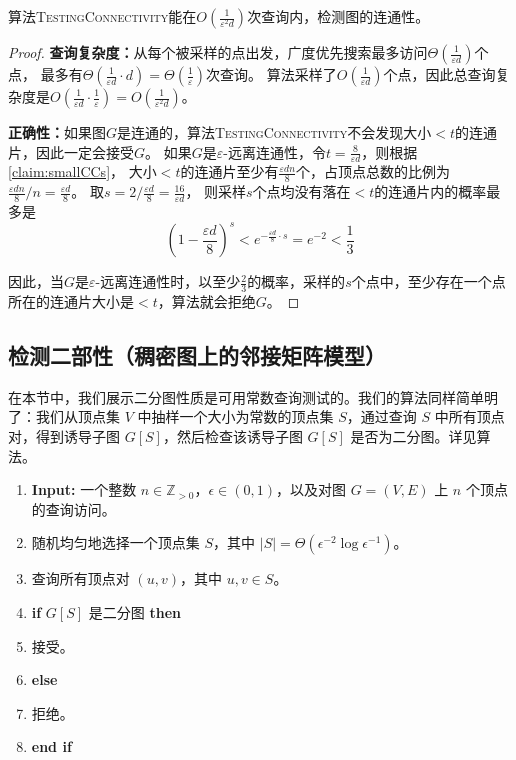 \begin{theorem}
    算法\textsc{TestingConnectivity}能在$O(\frac{1}{\varepsilon^2d})$次查询内，检测图的连通性。
\end{theorem}

\begin{proof}
    \textbf{查询复杂度：}从每个被采样的点出发，广度优先搜索最多访问$\Theta(\frac{1}{\varepsilon d})$个点，
    最多有$\Theta(\frac{1}{\varepsilon d}\cdot d)=\Theta(\frac{1}{\varepsilon})$次查询。
    算法采样了$O(\frac{1}{\varepsilon d})$个点，因此总查询复杂度是$O(\frac{1}{\varepsilon d}\cdot\frac{1}{\varepsilon})=O(\frac{1}{\varepsilon^2 d})$。

    \textbf{正确性：}如果图$G$是连通的，算法\textsc{TestingConnectivity}不会发现大小$<t$的连通片，因此一定会接受$G$。
    如果$G$是$\varepsilon$-远离连通性，令$t=\frac{8}{\varepsilon d}$，则根据\cref{claim:smallCCs}，
    大小$<t$的连通片至少有$\frac{\varepsilon dn}{8}$个，占顶点总数的比例为$\frac{\varepsilon dn}{8}/n=\frac{\varepsilon d}{8}$。
    取$s=2/\frac{\varepsilon d}{8}=\frac{16}{\varepsilon d}$，
    则采样$s$个点均没有落在$<t$的连通片内的概率最多是
    \[
    \left(1-\frac{\varepsilon d}{8}\right)^s<e^{-\frac{\varepsilon d}{8}\cdot s}=e^{-2}<\frac{1}{3}
    \]

    因此，当$G$是$\varepsilon$-远离连通性时，以至少$\frac{2}{3}$的概率，采样的$s$个点中，至少存在一个点所在的连通片大小是$<t$，算法就会拒绝$G$。
\end{proof}

\subsection{检测二部性（稠密图上的邻接矩阵模型）}

在本节中，我们展示二分图性质是可用常数查询测试的。我们的算法同样简单明了：我们从顶点集 $ V $ 中抽样一个大小为常数的顶点集 $ S $，通过查询 $ S $ 中所有顶点对，得到诱导子图 $ G[S] $，然后检查该诱导子图 $ G[S] $ 是否为二分图。详见算法。
\begin{algorithm}[h]
	\caption{\textbf{二部性检测算法}}
	\label{alg-bipartite-test}
	\begin{enumerate}
    \item \textbf{Input:} 一个整数 $ n \in \mathbb{Z}_{>0} $，$ \epsilon \in (0, 1) $，以及对图 $ G = (V, E) $ 上 $ n $ 个顶点的查询访问。
    \item 随机均匀地选择一个顶点集 $ S $，其中 $ |S| = \Theta(\epsilon^{-2} \log \epsilon^{-1}) $。
    \item 查询所有顶点对 $ (u, v) $，其中 $ u, v \in S $。
    \item \textbf{if} $ G[S] $ 是二分图 \textbf{then}
    \item \hspace{1em} 接受。
    \item \textbf{else}
    \item \hspace{1em} 拒绝。
    \item \textbf{end if}
\end{enumerate}
\end{algorithm}


